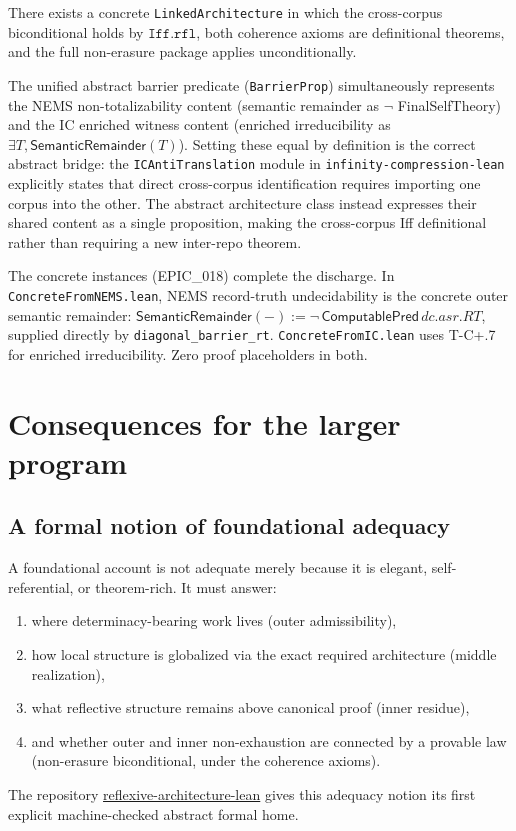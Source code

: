 \documentclass[11pt]{article}
\newcommand{\SemRem}{\ensuremath{\mathsf{SemanticRemainder}}}
\begin{document}
\begin{theorem}
\label{thm:crosscorpus}
There exists a concrete \texttt{LinkedArchitecture} in which the cross-corpus
biconditional holds by $\mathtt{Iff.rfl}$, both coherence axioms are
definitional theorems, and the full non-erasure package applies unconditionally.
\par{}
\end{theorem}

The unified abstract barrier predicate (\texttt{BarrierProp}) simultaneously
represents the NEMS non-totalizability content (semantic remainder as $\neg$ FinalSelfTheory)
and the IC enriched witness content (enriched irreducibility as $\exists T, \SemRem(T)$).
Setting these equal by definition is the correct abstract bridge: the \texttt{ICAntiTranslation}
module in \texttt{infinity-compression-lean} explicitly states that direct cross-corpus
identification requires importing one corpus into the other.  The abstract architecture
class instead expresses their shared content as a single proposition, making the
cross-corpus Iff definitional rather than requiring a new inter-repo theorem.

The concrete instances (EPIC\_018) complete the discharge.
In \texttt{ConcreteFromNEMS.lean}, NEMS record-truth undecidability
is the concrete outer semantic remainder:
$\SemRem(-) := \neg\,\mathsf{ComputablePred}\,\mathit{dc.asr.RT}$,
supplied directly by \texttt{diagonal\_barrier\_rt}.
\texttt{ConcreteFromIC.lean} uses T-C+.7 for enriched irreducibility.
Zero proof placeholders in both.

\section{Consequences for the larger program}
\label{sec:consequences}

\subsection{A formal notion of foundational adequacy}

A foundational account is not adequate merely because it is elegant, self-referential,
or theorem-rich.  It must answer:
\begin{enumerate}[leftmargin=2em]
\item where determinacy-bearing work lives (outer admissibility),
\item how local structure is globalized via the exact required architecture (middle
realization),
\item what reflective structure remains above canonical proof (inner residue),
\item and whether outer and inner non-exhaustion are connected by a provable law (non-erasure
biconditional, under the coherence axioms).
\end{enumerate}
The repository \url{reflexive-architecture-lean} gives this adequacy notion its first
explicit machine-checked abstract formal home.
\end{document}
